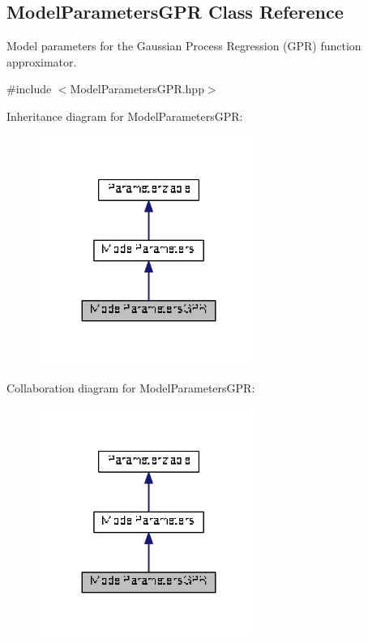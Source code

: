 \hypertarget{classDmpBbo_1_1ModelParametersGPR}{\subsection{Model\+Parameters\+G\+P\+R Class Reference}
\label{classDmpBbo_1_1ModelParametersGPR}
}


Model parameters for the Gaussian Process Regression (G\+P\+R) function approximator.  




{\ttfamily \#include $<$Model\+Parameters\+G\+P\+R.\+hpp$>$}



Inheritance diagram for Model\+Parameters\+G\+P\+R\+:
\nopagebreak
\begin{figure}[H]
\begin{center}
\leavevmode
\includegraphics[width=203pt]{classDmpBbo_1_1ModelParametersGPR__inherit__graph}
\end{center}
\end{figure}


Collaboration diagram for Model\+Parameters\+G\+P\+R\+:
\nopagebreak
\begin{figure}[H]
\begin{center}
\leavevmode
\includegraphics[width=203pt]{classDmpBbo_1_1ModelParametersGPR__coll__graph}
\end{center}
\end{figure}

